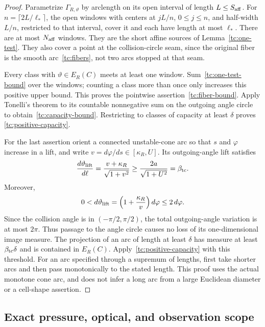 \begin{proof}
Parametrize $\Gamma_{R,\vartheta}$ by arclength on its open
interval of length $L\le S_{\rm aff}$.  For
$n=\lceil2L/\ell_*\rceil$, the open windows with centers at
$jL/n$, $0\le j\le n$, and half-width $L/n$, restricted to that
interval, cover it and each have length at most $\ell_*$.
There are at most $N_{\rm aff}$ windows.  They are the short
affine sources of Lemma~\ref{tc:one-test}.  They also cover a
point at the collision-circle seam, since the original fiber is
the smooth arc~\eqref{tc:fibers}, not two arcs stopped at that seam.

Every class with $\vartheta\in E_R(C)$ meets at least one window.
Sum~\eqref{tc:one-test-bound} over the windows; counting a class
more than once only increases this positive upper bound.  This
proves the pointwise assertion~\eqref{tc:fiber-bound}.  Apply
Tonelli's theorem to its countable nonnegative sum on the outgoing
angle circle to obtain~\eqref{tc:capacity-bound}.  Restricting to
classes of capacity at least $\delta$ proves
\eqref{tc:positive-capacity}.

For the last assertion orient a connected unstable-cone arc so
that $s$ and $\varphi$ increase in a lift, and write
$v=d\varphi/ds\in[\kappa_R,U]$.  Its outgoing-angle lift satisfies
\begin{equation}\label{tc:projection-derivative}
 {d\vartheta_{\rm lift}\over d\ell}
       ={v+\kappa_R\over\sqrt{1+v^2}}
                   \ge {2a\over\sqrt{1+U^2}}=\beta_{\rm tc}.
\end{equation}
Moreover,
\[
 0<d\vartheta_{\rm lift}
       =\left(1+{\kappa_R\over v}\right)d\varphi
       \le2\,d\varphi.
\]
Since the collision angle is in $(-\pi/2,\pi/2)$, the total
outgoing-angle variation is at most $2\pi$.  Thus passage to the
angle circle causes no loss of its one-dimensional image measure.
The projection of an arc of length at least $\delta$ has measure
at least $\beta_{\rm tc}\delta$ and is contained in $E_R(C)$.
Apply~\eqref{tc:positive-capacity} with this threshold.  For an
arc specified through a supremum of lengths, first take shorter
arcs and then pass monotonically to the stated length.  This proof
uses the actual monotone cone arc, and does not infer a long arc
from a large Euclidean diameter or a cell-shape assertion.
\end{proof}

\subsection{Exact pressure, optical, and observation scope}

